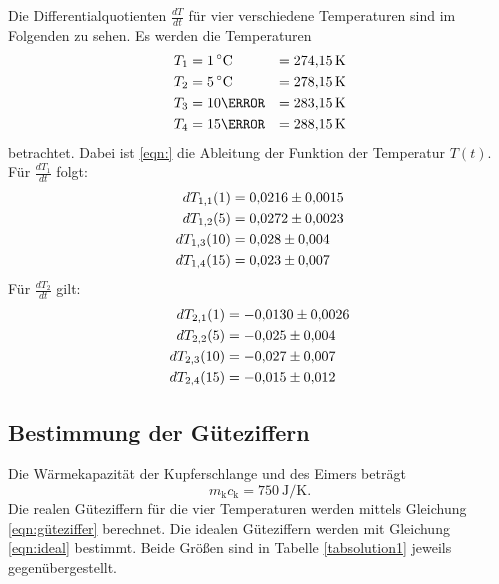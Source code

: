 Die Differentialquotienten $\frac{dT}{dt}$ für vier verschiedene Temperaturen
sind im Folgenden zu sehen. Es werden die Temperaturen
\begin{align*}
    T_1 &= \SI{1}{\degreeCelsius} &= \SI{274.15}{\kelvin} \\
    T_2 &= \SI{5}{\degreeCelsius} &= \SI{278.15}{\kelvin}\\
    T_3 &= \num{10}{\degreeCelsius} &= \SI{283.15}{\kelvin}\\
    T_4 &= \num{15}{\degreeCelsius} &= \SI{288.15}{\kelvin}
\end{align*}
betrachtet.
Dabei ist \eqref{eqn:} %
die Ableitung der Funktion der Temperatur $T(t)$.
Für $\frac{dT_1}{dt}$ folgt:
\begin{align*}
    dT_{1,1}(1) &= \num{0.0216 \pm 0.0015} \\
    dT_{1,2}(5) &= \num{0.0272 \pm 0.0023} \\
    dT_{1,3}(10) &= \num{0.028 \pm 0.004} \\
    dT_{1,4}(15) &= \num{0.023 \pm 0.007} %
\end{align*}
Für $\frac{dT_2}{dt}$ gilt:
\begin{align*}
    dT_{2,1}(1) &= \num{-0.0130 \pm 0.0026} \\ %
    dT_{2,2}(5) &= \num{-0.025 \pm 0.004} \\
    dT_{2,3}(10) &= \num{-0.027 \pm 0.007} \\
    dT_{2,4}(15) &= \num{-0.015 \pm 0.012}
\end{align*}

\subsection{Bestimmung der Güteziffern}
Die Wärmekapazität der Kupferschlange und des Eimers beträgt
\begin{equation*}
    m_\text{k} c_\text{k} = \SI{750}{\joule\per\kelvin}.
\end{equation*}
Die realen Güteziffern für die vier Temperaturen werden mittels
Gleichung \eqref{eqn:güteziffer} berechnet. %
Die idealen Güteziffern werden mit Gleichung \eqref{eqn:ideal} %
bestimmt.
Beide Größen sind in Tabelle \ref{tabsolution1} jeweils
gegenübergestellt.


